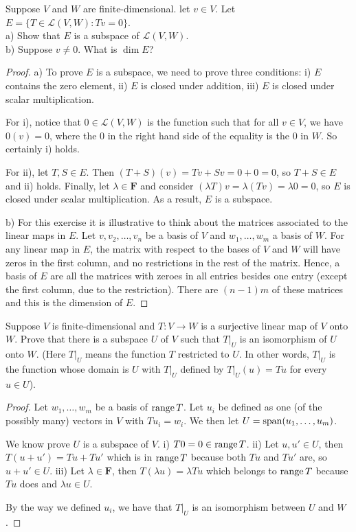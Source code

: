 \begin{exercise}{7}
  Suppose $V$ and $W$ are finite-dimensional. let $v\in V$. Let $E=\{T\in\mathcal{L}(V,W):Tv=0\}$.\\
  a) Show that $E$ is a subspace of $\mathcal{L}(V,W)$.\\
  b) Suppose $v\neq0$. What is $\dim E$?
\end{exercise}
\begin{proof}
 a) To prove $E$ is a subspace, we need to prove three conditions: i) $E$ contains the zero element, ii) $E$ is closed under addition, iii) $E$ is closed under scalar multiplication. 
 
 For i), notice that $0\in\mathcal{L}(V,W)$ is the function such that for all $v\in V$, we have $0(v)=0$, where the 0 in the right hand side of the equality is the 0 in $W$. So certainly i) holds. 
 
 For ii), let $T,S\in E$. Then $(T+S)(v)=Tv+Sv=0+0=0$, so $T+S\in E$ and ii) holds. Finally, let $\lambda\in\mathbf{F}$ and consider $(\lambda T)v=\lambda (Tv)=\lambda 0=0$, so $E$ is closed under scalar multiplication. As a result, $E$ is a subspace.
 
 b) For this exercise it is illustrative to think about the matrices associated to the linear maps in $E$. Let $v, v_{2},\dots,v_{n}$ be a basis of $V$ and $w_{1},\dots,w_{m}$ a basis of $W$. For any linear map in $E$, the matrix with respect to the bases of $V$ and $W$ will have zeros in the first column, and no restrictions in the rest of the matrix. Hence, a basis of $E$ are all the matrices with zeroes in all entries besides one entry (except the first column, due to the restriction). There are $(n-1)m$ of these matrices and this is the dimension of $E$.
\end{proof}


\begin{exercise}{8}
  Suppose $V$ is finite-dimensional and $T:V\rightarrow W$ is a surjective linear map of $V$ onto $W$. 
  Prove that there is a subspace $U$ of $V$ such that $T\vert_{U}$ is an isomorphism of $U$ onto $W$. 
  (Here $T\vert_{U}$ means the function $T$ restricted to $U$. 
  In other words, $T\vert_{U}$ is the function whose domain is $U$ with $T\vert_{U}$ defined by $T\vert_{U}(u)=Tu$ for every $u\in U$).
\end{exercise}
\begin{proof}
 Let $w_{1},\dots,w_{m}$ be a basis of $\operatorname*{range} T$. 
 Let $u_{i}$ be defined as one (of the possibly many) vectors in $V$ with $Tu_{i}=w_{i}$. 
 We then let $U=\operatorname*{span}(u_{1},\dots,u_{m})$.
 
 We know prove $U$ is a subspace of $V$. i) $T0=0\in\operatorname*{range} T$. ii) Let $u,u'\in U$, then $T(u+u')=Tu+Tu'$ which is in $\operatorname*{range} T$ because both $Tu$ and $Tu'$ are, so $u+u'\in U$. iii) Let $\lambda\in\mathbf{F}$, then $T(\lambda u)=\lambda Tu$ which belongs to $\operatorname*{range} T$ because $Tu$ does and $\lambda u\in U$.
 
 By the way we defined $u_{i}$, we have that $T\vert_{U}$ is an isomorphism between $U$ and $W$.
\end{proof}


